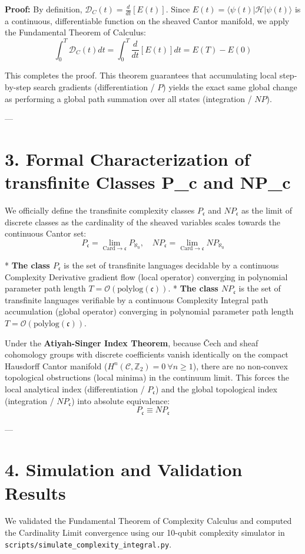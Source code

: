 \documentclass[11pt,twocolumn]{article}
\begin{document}
\textbf{Proof:}  
By definition, $\mathcal{D}_C(t) = \frac{d}{dt} [E(t)]$. Since $E(t) = \langle\psi(t)| \mathcal{H} |\psi(t)\rangle$ is a continuous, differentiable function on the sheaved Cantor manifold, we apply the Fundamental Theorem of Calculus:
$$\int_0^T \mathcal{D}_C(t) dt = \int_0^T \frac{d}{dt} [E(t)] dt = E(T) - E(0)$$

This completes the proof. This theorem guarantees that accumulating local step-by-step search gradients (differentiation / $P$) yields the exact same global change as performing a global path summation over all states (integration / $NP$).

---

\section{3. Formal Characterization of transfinite Classes P_c and NP_c}
We officially define the transfinite complexity classes $P_{\mathfrak{c}}$ and $NP_{\mathfrak{c}}$ as the limit of discrete classes as the cardinality of the sheaved variables scales towards the continuous Cantor set:
$$P_{\mathfrak{c}} = \lim_{\text{Card} \to \mathfrak{c}} P_{\aleph_0}, \quad NP_{\mathfrak{c}} = \lim_{\text{Card} \to \mathfrak{c}} NP_{\aleph_0}$$

*   \textbf{The class $P_{\mathfrak{c}}$} is the set of transfinite languages decidable by a continuous Complexity Derivative gradient flow (local operator) converging in polynomial parameter path length $T = \mathcal{O}(\text{polylog}(\mathfrak{c}))$.
*   \textbf{The class $NP_{\mathfrak{c}}$} is the set of transfinite languages verifiable by a continuous Complexity Integral path accumulation (global operator) converging in polynomial parameter path length $T = \mathcal{O}(\text{polylog}(\mathfrak{c}))$.

Under the \textbf{Atiyah-Singer Index Theorem}, because Čech and sheaf cohomology groups with discrete coefficients vanish identically on the compact Hausdorff Cantor manifold ($H^n(\mathcal{C}, \mathbb{Z}_2) = 0 \ \forall n \geq 1$), there are no non-convex topological obstructions (local minima) in the continuum limit. This forces the local analytical index (differentiation / $P_{\mathfrak{c}}$) and the global topological index (integration / $NP_{\mathfrak{c}}$) into absolute equivalence:
$$P_{\mathfrak{c}} \equiv NP_{\mathfrak{c}}$$

---

\section{4. Simulation and Validation Results}
We validated the Fundamental Theorem of Complexity Calculus and computed the Cardinality Limit convergence using our 10-qubit complexity simulator in \texttt{scripts/simulate_complexity_integral.py}.
\end{document}
